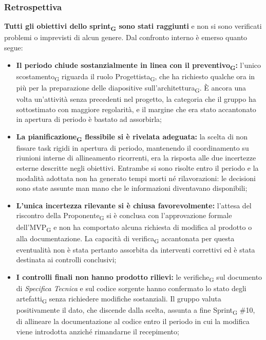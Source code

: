 ﻿\documentclass[a4paper, 10pt, colorlinks=true, linkcolor=black, urlcolor=blue, citecolor=blue, hidelinks]{article}
\begin{document}
\subsubsection{Retrospettiva}
\textbf{Tutti gli obiettivi dello sprint\textsubscript{G} sono stati raggiunti} e non si sono verificati problemi o imprevisti di alcun genere. Dal confronto interno è emerso quanto segue:
\begin{itemize}
    \item \textbf{Il periodo chiude sostanzialmente in linea con il preventivo\textsubscript{G}:} l'unico scostamento\textsubscript{G} riguarda il ruolo Progettista\textsubscript{G}, che ha richiesto qualche ora in più per la preparazione delle diapositive sull'architettura\textsubscript{G}. È ancora una volta un'attività senza precedenti nel progetto, la categoria che il gruppo ha sottostimato con maggiore regolarità, e il margine che era stato accantonato in apertura di periodo è bastato ad assorbirla;

    \item \textbf{La pianificazione\textsubscript{G} flessibile si è rivelata adeguata:} la scelta di non fissare task rigidi in apertura di periodo, mantenendo il coordinamento su riunioni interne di allineamento ricorrenti, era la risposta alle due incertezze esterne descritte negli obiettivi. Entrambe si sono risolte entro il periodo e la modalità adottata non ha generato tempi morti né rilavorazioni: le decisioni sono state assunte man mano che le informazioni diventavano disponibili;

    \item \textbf{L'unica incertezza rilevante si è chiusa favorevolmente:} l'attesa del riscontro della Proponente\textsubscript{G} si è conclusa con l'approvazione formale dell'MVP\textsubscript{G} e non ha comportato alcuna richiesta di modifica al prodotto o alla documentazione. La capacità di verifica\textsubscript{G} accantonata per questa eventualità non è stata pertanto assorbita da interventi correttivi ed è stata destinata ai controlli conclusivi;

    \item \textbf{I controlli finali non hanno prodotto rilievi:} le verifiche\textsubscript{G} sul documento di \textit{Specifica Tecnica} e sul codice sorgente hanno confermato lo stato degli artefatti\textsubscript{G} senza richiedere modifiche sostanziali. Il gruppo valuta positivamente il dato, che discende dalla scelta, assunta a fine Sprint\textsubscript{G} \#10, di allineare la documentazione al codice entro il periodo in cui la modifica viene introdotta anziché rimandarne il recepimento;


\end{itemize}
\end{document}
